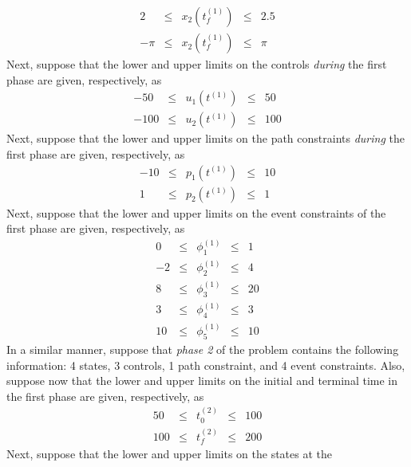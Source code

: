 \documentclass[10pt,final]{report}
\newenvironment{shadedframe}{%
  \def\FrameCommand{\fcolorbox{black}{shadecolor}}%
  \MakeFramed {\FrameRestore}}
{\endMakeFramed}
\begin{document}
\begin{shadedframe}
\begin{displaymath}
\begin{array}{rcccr}
    2 & \leq & x_2(t_f^{(1)}) & \leq & 2.5 \\
    -\pi & \leq & x_2(t_f^{(1)}) & \leq & \pi
  \end{array}
\end{displaymath}
Next, suppose that the lower and upper limits on the controls
{\em during} the first phase are given, respectively, as
\begin{displaymath}
  \begin{array}{rcccr}
    -50 & \leq & u_1(t^{(1)}) & \leq & 50 \\
    -100 & \leq & u_2(t^{(1)})& \leq & 100
  \end{array}
\end{displaymath}
Next, suppose that the lower and upper limits on the path constraints
{\em during} the first phase are given, respectively, as
\begin{displaymath}
  \begin{array}{rcccr}
    -10 & \leq & p_1(t^{(1)}) & \leq & 10 \\
     1 & \leq & p_2(t^{(1)})& \leq & 1
  \end{array}
\end{displaymath}
Next, suppose that the lower and upper limits on the event constraints
of the first phase are given, respectively, as
\begin{displaymath}
  \begin{array}{rcccr}
    0 & \leq & \phi_1^{(1)} & \leq & 1 \\
     -2 & \leq & \phi_2^{(1)} & \leq & 4 \\
    8 & \leq & \phi_3^{(1)} & \leq & 20 \\
    3 & \leq & \phi_4^{(1)} & \leq & 3 \\
    10 & \leq & \phi_5^{(1)} & \leq & 10
  \end{array}
\end{displaymath}
In a similar manner, suppose that {\em phase 2} of the problem contains the
following information:  4 states, 3 controls, 1 path constraint, and 4
event constraints.  Also, suppose now that the lower and upper limits
on the initial and terminal time in the first phase are given,
respectively, as
\begin{displaymath}
  \begin{array}{rcccr}
    50 & \leq  & t_0^{(2)} & \leq & 100 \\
    100 & \leq & t_f^{(2)} & \leq & 200
  \end{array}
\end{displaymath}
Next, suppose that the lower and upper limits on the states at the

\end{shadedframe}
\end{document}

